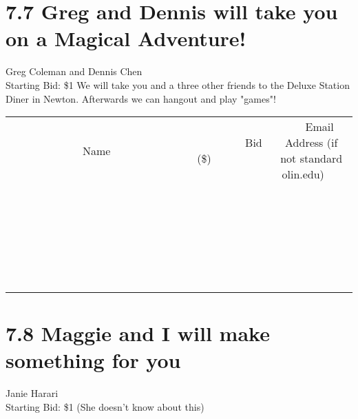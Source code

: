\documentclass[11pt]{article}
\begin{document}
\section*{7.7 Greg and Dennis will take you on a Magical Adventure!}
Greg Coleman and Dennis Chen
\\
Starting Bid: \$1
\newline
We will take you and a three other friends to the Deluxe Station Diner in Newton. Afterwards we can hangout and play "games"!
\\[6ex]
\begin{tabular}{c c c}
~~~~~~~~~~~~~Name~~~~~~~~~~~~~ & ~~~~~~~~~Bid (\$)~~~~~~~~~  & ~~~Email Address (if not standard olin.edu)~~~\\
 & & \\
\hline
 & & \\
\hline
 & & \\
\hline
 & & \\
\hline
 & & \\
\hline
 & & \\
\hline
 & & \\
\hline
 & & \\
\hline
 & & \\
\hline
 & & \\
\hline
 & & \\
\hline
 & & \\
\hline
 & & \\
\hline
 & & \\
\hline
 & & \\
\hline
 & & \\
\hline
 & & \\
\hline
 & & \\
\hline
 & & \\
\hline
 & & \\
\hline
 & & \\
\hline
 & & \\
\hline
 & & \\
\hline
 & & \\
\hline
 & & \\
\hline
 & & \\
\hline
\end{tabular}
\newpage
\section*{7.8 Maggie and I will make something for you}
Janie Harari
\\
Starting Bid: \$1
\newline
(She doesn't know about this)
\end{document}
